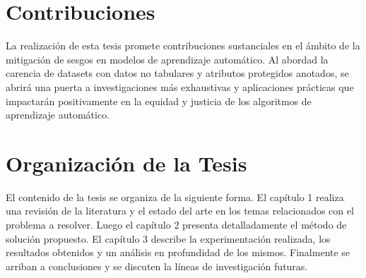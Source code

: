 \section*{Contribuciones}
La realizaci\'on de esta tesis promete contribuciones sustanciales en el \'ambito de la mitigaci\'on de sesgos en modelos de aprendizaje 
autom\'atico. Al abordad la carencia de datasets con datos no tabulares y atributos protegidos anotados, se abrir\'a una puerta a investigaciones
m\'as exhaustivas y aplicaciones pr\'acticas que impactar\'an positivamente en la equidad y justicia de los algoritmos de aprendizaje autom\'atico.

\section*{Organizaci\'on de la Tesis}
El contenido de la tesis se organiza de la siguiente forma. El cap\'itulo 1 realiza una revisi\'on de la literatura y el estado del arte en los temas
relacionados con el problema a resolver. Luego el cap\'itulo 2 presenta detalladamente el m\'etodo de soluci\'on propuesto. 
El cap\'itulo 3 describe la experimentaci\'on realizada, los resultados obtenidos y un an\'alisis en profundidad de los mismos. Finalmente se 
arriban a conclusiones y se discuten la l\'ineas de investigaci\'on futuras.  